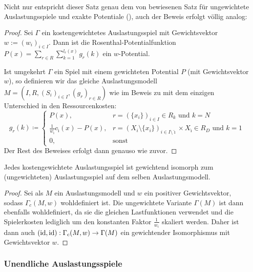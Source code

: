 Nicht nur entspricht dieser Satz genau dem von \citeauthor{MonShap} bewiesenen Satz für ungewichtete Auslastungsspiele und exakte Potentiale (), auch der Beweis erfolgt völlig analog: 

\begin{proof}
	Sei $\Gamma$ ein kostengewichtetes Auslastungsspiel mit Gewichtsvektor $w := (w_i)_{i\in I}$. Dann ist die Rosenthal-Potentialfunktion $P(x) = \sum_{r \in R}\sum_{k=1}^{l_r(x)}g_r(k)$ ein $w$-Potential.
		
	Ist umgekehrt $\Gamma$ ein Spiel mit einem gewichteten Potential $P$ (mit Gewichtsvektor $w$), so definieren wir das gleiche Auslastungsmodell $M = (I, R, (S_i)_{i \in I}, (g_r)_{r \in R})$ wie im Beweis zu  mit dem einzigen Unterschied in den Ressourcenkosten:
		\[g_r(k) \coloneqq 
		\begin{cases}
		P(x), 									&r = \left(\{x_i\}\right)_{i \in I} \in R_k 													\text{ und } k=N \\
		\frac{1}{w_{\hat{\imath}}}c_{\hat{\imath}}(x) - P(x), 	&r = \left(X_i\setminus\{x_i\}\right)_{i \in I\setminus\hat{\imath}} \times X_{\hat{\imath}} \in R_D 	\text{ und } k=1 \\
		0,										&\text{sonst}
		\end{cases}\]
	Der Rest des Beweises erfolgt dann genauso wie zuvor.
\end{proof}

\begin{lemma}\label{lemma:KostengewAuslIsomZuAusl}
	Jedes kostengewichtete Auslastungsspiel ist gewichtend isomorph zum (ungewichteten) Auslastungsspiel auf dem selben Auslastungsmodell.
\end{lemma}

\begin{proof}
	Sei als $M$ ein Auslastungsmodell und $w$ ein positiver Gewichtsvektor, sodass $\Gamma_c(M, w)$ wohldefiniert ist. Die ungewichtete Variante $\Gamma(M)$ ist dann ebenfalls wohldefiniert, da sie die gleichen Lastfunktionen verwendet und die Spielerkosten lediglich um den konstanten Faktor $\frac{1}{w_i}$ skaliert werden. Daher ist dann auch $(\mathrm{id}, \mathrm{id}): \Gamma_c(M,w) \to \Gamma(M)$ ein gewichtender Isomorphismus mit Gewichtsvektor $w$.
\end{proof}


\subsubsection{Unendliche Auslastungsspiele}\label{sec:Auslastungsspiele:unendliche}

